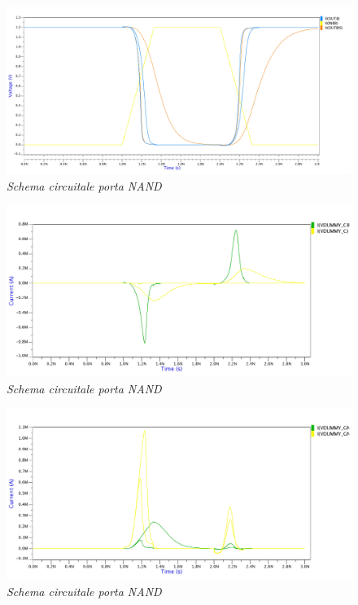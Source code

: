 \newpage
\begin{figure}[!htb]
	\centering
	\includegraphics[scale=0.09]{immagini/onde_5_3_voltage1}
	\caption{\textit{Schema circuitale porta NAND}}
	\label{onde_5_3_voltage1}
\end{figure}
\begin{figure}[!htb]
	\centering
	\includegraphics[scale=0.12]{immagini/onde_5_3_current1}
	\caption{\textit{Schema circuitale porta NAND}}
	\label{onde_5_3_current1}
\end{figure}
\newpage
\begin{figure}[!htb]
	\centering
	\includegraphics[scale=0.12]{immagini/onde_5_3_current2}
	\caption{\textit{Schema circuitale porta NAND}}
	\label{onde_5_3_current2}
\end{figure}
